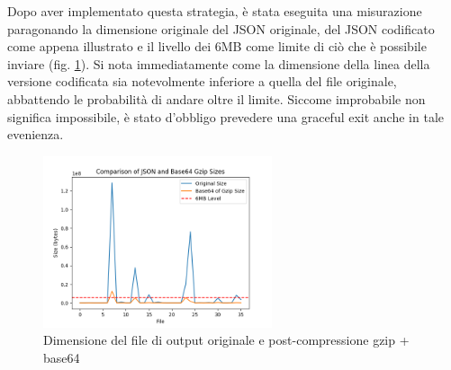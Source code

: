 Dopo aver implementato questa strategia, è stata eseguita una misurazione paragonando la dimensione originale del JSON originale, del JSON codificato come appena illustrato e il livello dei 6MB come limite di ciò che è possibile inviare (fig. \ref{fig:static_analysis_results_size}). Si nota immediatamente come la dimensione della linea della versione codificata sia notevolmente inferiore a quella del file originale, abbattendo le probabilità di andare oltre il limite.
Siccome improbabile non significa impossibile, è stato d'obbligo prevedere una graceful exit anche in tale evenienza.

\begin{figure}[htbp]
    \centering
    \includegraphics[width=0.6\textwidth]{assets/static_analysis_results_size.png}
    \caption{Dimensione del file di output originale e post-compressione gzip + base64}
    \label{fig:static_analysis_results_size}
\end{figure}

